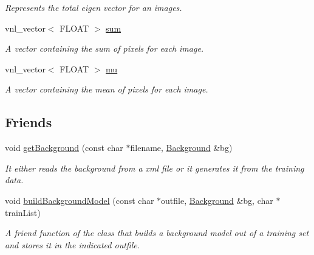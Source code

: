 \begin{DoxyCompactItemize}
\begin{DoxyCompactList}\small\item\em Represents the total eigen vector for an images. \item\end{DoxyCompactList}\item 
\hypertarget{classBackground_acf1c2f84aee675205f2d93e5006b0cd8}{
vnl\_\-vector$<$ FLOAT $>$ \hyperlink{classBackground_acf1c2f84aee675205f2d93e5006b0cd8}{sum}}
\label{classBackground_acf1c2f84aee675205f2d93e5006b0cd8}

\begin{DoxyCompactList}\small\item\em A vector containing the sum of pixels for each image. \item\end{DoxyCompactList}\item 
\hypertarget{classBackground_a23c1622d0f5af8a8a8cd90dd1898f3cb}{
vnl\_\-vector$<$ FLOAT $>$ \hyperlink{classBackground_a23c1622d0f5af8a8a8cd90dd1898f3cb}{mu}}
\label{classBackground_a23c1622d0f5af8a8a8cd90dd1898f3cb}

\begin{DoxyCompactList}\small\item\em A vector containing the mean of pixels for each image. \item\end{DoxyCompactList}\end{DoxyCompactItemize}
\subsection*{Friends}
\begin{DoxyCompactItemize}
\item 
\hypertarget{classBackground_ae47cc14758dff025e5dd4ed058964152}{
void \hyperlink{classBackground_ae47cc14758dff025e5dd4ed058964152}{getBackground} (const char $\ast$filename, \hyperlink{classBackground}{Background} \&bg)}
\label{classBackground_ae47cc14758dff025e5dd4ed058964152}

\begin{DoxyCompactList}\small\item\em It either reads the background from a xml file or it generates it from the training data. \item\end{DoxyCompactList}\item 
\hypertarget{classBackground_a082d1f14223caf63744babac4fdc44d2}{
void \hyperlink{classBackground_a082d1f14223caf63744babac4fdc44d2}{buildBackgroundModel} (const char $\ast$outfile, \hyperlink{classBackground}{Background} \&bg, char $\ast$trainList)}
\label{classBackground_a082d1f14223caf63744babac4fdc44d2}

\begin{DoxyCompactList}\small\item\em A friend function of the class that builds a background model out of a training set and stores it in the indicated {\ttfamily outfile}. \item\end{DoxyCompactList}\end{DoxyCompactItemize}
